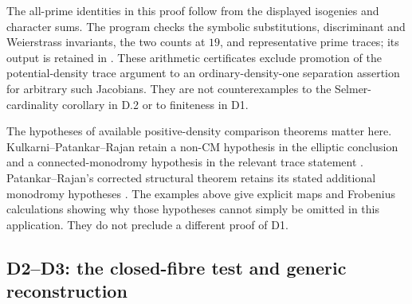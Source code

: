The all-prime identities in this proof follow from the displayed
isogenies and character sums. The program
 checks the symbolic
substitutions, discriminant and Weierstrass invariants, the
two counts at $19$, and representative prime traces; its output
is retained in .
These arithmetic certificates exclude promotion of the
potential-density trace argument to an ordinary-density-one
separation assertion for arbitrary such Jacobians. They are
not counterexamples to the Selmer-cardinality corollary in
D.2 or to finiteness in D1.

The hypotheses of available positive-density comparison theorems
matter here. Kulkarni--Patankar--Rajan retain a non-CM hypothesis
in the elliptic conclusion and a connected-monodromy hypothesis
in the relevant trace statement
\cite[Theorems 1.1, 1.5 and 1.6]{AgentKPR}.
Patankar--Rajan's corrected structural theorem retains its
stated additional monodromy hypotheses
\cite[Introduction and Example 1.1]{AgentPatankarRajan}.
The examples above give explicit maps and Frobenius calculations
showing why those hypotheses cannot simply be omitted in this
application. They do not preclude a different proof of D1.

\subsection{D2--D3: the closed-fibre test and generic reconstruction}

